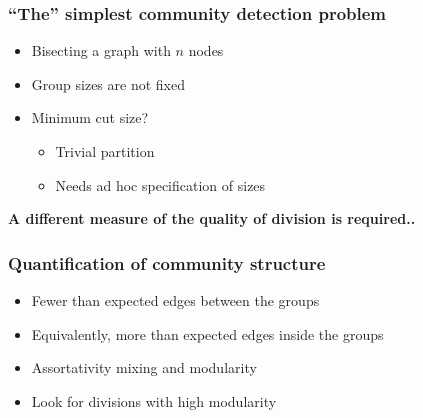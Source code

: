 \documentclass{beamer}
\begin{document}
\begin{frame}
    \frametitle{``The'' simplest community detection problem}
    \centering
    \begin{itemize}
    \setlength\itemsep{1em}
        \item{Bisecting a graph with $n$ nodes}
        \item{Group sizes are not fixed}
        \item{Minimum cut size?

            \begin{itemize}
            \setlength\itemsep{1em}
                \item{Trivial partition}
                \item{Needs ad hoc specification of sizes}
            \end{itemize}

}

    \end{itemize}

    \vspace{2em}
    \pause
    {\bf A different measure of the quality of division is required..}
\end{frame}
\begin{frame}
    \frametitle{Quantification of community structure}
    \centering

    \begin{itemize}
        \setlength\itemsep{1em}
        \item{Fewer than expected edges between the groups}
            \pause
        \item{Equivalently, more than expected edges inside the groups}
            \pause
        \item{Assortativity mixing and modularity}
            \pause
        \item{Look for divisions with high modularity}
    \end{itemize}

\end{frame}
\end{document}
